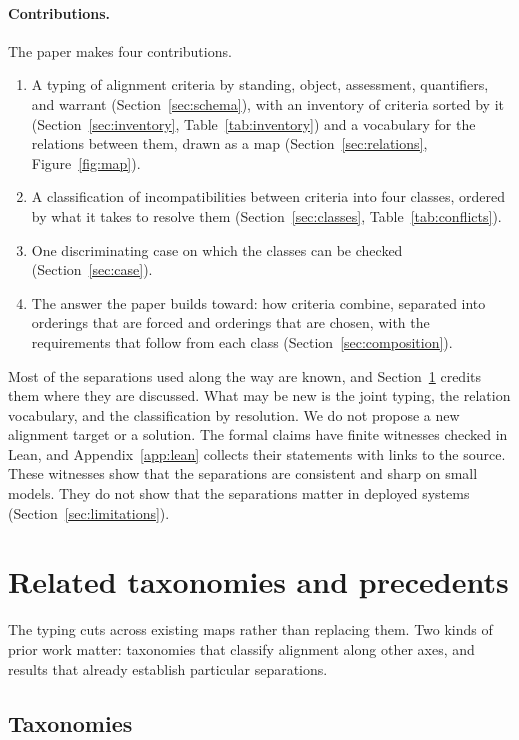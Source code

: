 \documentclass[11pt]{article}
\begin{document}
\paragraph{Contributions.}
The paper makes four contributions.
\begin{enumerate}[leftmargin=1.5em,itemsep=0pt]
  \item A typing of alignment criteria by standing, object, assessment, quantifiers, and warrant (Section~\ref{sec:schema}), with an inventory of criteria sorted by it (Section~\ref{sec:inventory}, Table~\ref{tab:inventory}) and a vocabulary for the relations between them, drawn as a map (Section~\ref{sec:relations}, Figure~\ref{fig:map}).
  \item A classification of incompatibilities between criteria into four classes, ordered by what it takes to resolve them (Section~\ref{sec:classes}, Table~\ref{tab:conflicts}).
  \item One discriminating case on which the classes can be checked (Section~\ref{sec:case}).
  \item The answer the paper builds toward: how criteria combine, separated into orderings that are forced and orderings that are chosen, with the requirements that follow from each class (Section~\ref{sec:composition}).
\end{enumerate}
Most of the separations used along the way are known, and Section~\ref{sec:related} credits them where they are discussed.
What may be new is the joint typing, the relation vocabulary, and the classification by resolution.
We do not propose a new alignment target or a solution.
The formal claims have finite witnesses checked in Lean, and Appendix~\ref{app:lean} collects their statements with links to the source.
These witnesses show that the separations are consistent and sharp on small models.
They do not show that the separations matter in deployed systems (Section~\ref{sec:limitations}).

\section{Related taxonomies and precedents}
\label{sec:related}

The typing cuts across existing maps rather than replacing them.
Two kinds of prior work matter: taxonomies that classify alignment along other axes, and results that already establish particular separations.

\subsection{Taxonomies}
\end{document}
